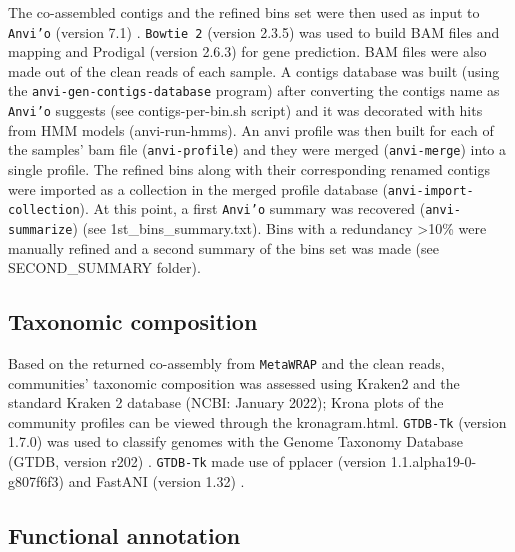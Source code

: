    The co-assembled contigs and the refined bins set were then used as input to \texttt{Anvi’o} (version 7.1) \citep{eren_anvio_2015}. 
   \texttt{Bowtie 2} (version 2.3.5) \citep{langmead_fast_2012} was used to build BAM files and mapping and Prodigal (version 2.6.3) \citep{hyatt_prodigal_2010} for gene prediction. 
   BAM files were also made out of the clean reads of each sample. 
   A contigs database was built (using the \texttt{anvi-gen-contigs-database} program) after converting the contigs name as \texttt{Anvi’o} suggests (see contigs-per-bin.sh script) and it was decorated with hits from HMM models (anvi-run-hmms). 
   An anvi profile was then built for each of the samples’ bam file (\texttt{anvi-profile}) and they were merged (\texttt{anvi-merge}) into a single profile. 
   The refined bins along with their corresponding renamed contigs were imported as a collection in the merged profile database (\texttt{anvi-import-collection}). 
   At this point, a first \texttt{Anvi’o} summary was recovered (\texttt{anvi-summarize}) (see 1st\_bins\_summary.txt). 
   Bins with a redundancy >10\% were manually refined and a second summary of the bins set was made (see SECOND\_SUMMARY folder). 


\subsection{Taxonomic composition}

   Based on the returned co-assembly from \texttt{MetaWRAP} and the clean reads, communities’ taxonomic composition was assessed using  Kraken2 \citep{wood_improved_2019} and the standard Kraken 2 database (NCBI: January 2022); 
   Krona plots of the community profiles can be viewed through the kronagram.html. 
   \texttt{GTDB-Tk} (version 1.7.0) \citep{chaumeil_gtdb-tk_2020} was used to classify genomes with the Genome Taxonomy Database (GTDB, version r202) \citep{parks_gtdb_2022}. 
   \texttt{GTDB-Tk} made use of pplacer (version 1.1.alpha19-0-g807f6f3) \citep{matsen_pplacer_2010} and FastANI (version 1.32) \citep{jain_high_2018}.


\subsection{Functional annotation}


